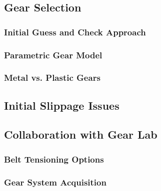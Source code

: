 \subsection{Gear Selection\label{sec:methedology:starveFeeder:gearSelection}}

\subsubsection{Initial Guess and Check Approach\label{sec:methedology:starveFeeder:gearSelection:initialGuessAndCheck}}

\subsubsection{Parametric Gear Model\label{sec:methedology:starveFeeder:gearSelection:parametricGearModel}}

\subsubsection{Metal vs. Plastic Gears\label{sec:methedology:starveFeeder:gearSelection:metalVsPlasticGears}}

\subsection{Initial Slippage Issues\label{sec:methedology:starveFeeder:initialSlippageIssues}}

\subsection{Collaboration with Gear Lab\label{sec:methedology:starveFeeder:gearLabCollaboration}}

\subsubsection{Belt Tensioning Options\label{sec:methedology:starveFeeder:gearLabCollaboration:beltTensioningOptions}}

\subsubsection{Gear System Acquisition\label{sec:methedology:starveFeeder:gearLabCollaboration:gearSystemAcquisition}}

